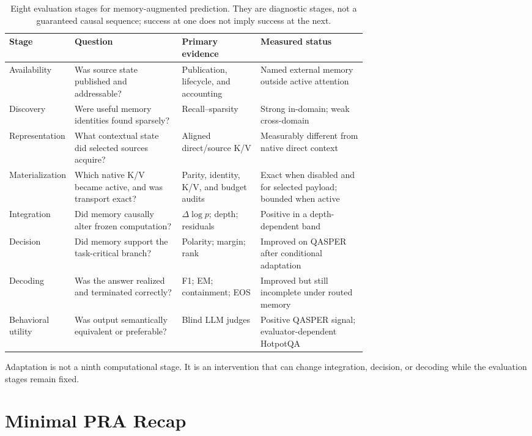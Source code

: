\documentclass[11pt]{article}
\begin{document}
\begin{table}[H]
\centering
\small
\caption{Eight evaluation stages for memory-augmented prediction. They are diagnostic stages, not
a guaranteed causal sequence; success at one does not imply success at the next.}
\label{tab:success-layers}
\begin{tabularx}{\linewidth}{L{0.16\linewidth}L{0.30\linewidth}L{0.22\linewidth}Y}
\toprule
Stage & Question & Primary evidence & Measured status \\
\midrule
Availability & Was source state published and addressable? & Publication, lifecycle, and accounting & Named external memory outside active attention \\
Discovery & Were useful memory identities found sparsely? & Recall--sparsity & Strong in-domain; weak cross-domain \\
Representation & What contextual state did selected sources acquire? & Aligned direct/source K/V & Measurably different from native direct context \\
Materialization & Which native K/V became active, and was transport exact? & Parity, identity, K/V, and budget audits & Exact when disabled and for selected payload; bounded when active \\
Integration & Did memory causally alter frozen computation? & $\Delta\log p$; depth; residuals & Positive in a depth-dependent band \\
Decision & Did memory support the task-critical branch? & Polarity; margin; rank & Improved on QASPER after conditional adaptation \\
Decoding & Was the answer realized and terminated correctly? & F1; EM; containment; EOS & Improved but still incomplete under routed memory \\
Behavioral utility & Was output semantically equivalent or preferable? & Blind LLM judges & Positive QASPER signal; evaluator-dependent HotpotQA \\
\bottomrule
\end{tabularx}
\end{table}

Adaptation is not a ninth computational stage. It is an intervention that can change integration,
decision, or decoding while the evaluation stages remain fixed.

\section{Minimal PRA Recap}
\end{document}
